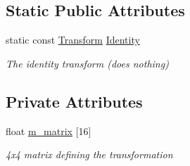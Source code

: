 \subsection*{Static Public Attributes}
\begin{DoxyCompactItemize}
\item 
\mbox{\label{classsf_1_1_transform_aa4eb1eecbcb9979d76e2543b337fdb13}} 
static const \mbox{\hyperlink{classsf_1_1_transform}{Transform}} \mbox{\hyperlink{classsf_1_1_transform_aa4eb1eecbcb9979d76e2543b337fdb13}{Identity}}
\begin{DoxyCompactList}\small\item\em The identity transform (does nothing) \end{DoxyCompactList}\end{DoxyCompactItemize}
\subsection*{Private Attributes}
\begin{DoxyCompactItemize}
\item 
\mbox{\label{classsf_1_1_transform_a1cd7f71fbf796010bb141806b67d73c9}} 
float \mbox{\hyperlink{classsf_1_1_transform_a1cd7f71fbf796010bb141806b67d73c9}{m\+\_\+matrix}} \mbox{[}16\mbox{]}
\begin{DoxyCompactList}\small\item\em 4x4 matrix defining the transformation \end{DoxyCompactList}\end{DoxyCompactItemize}
